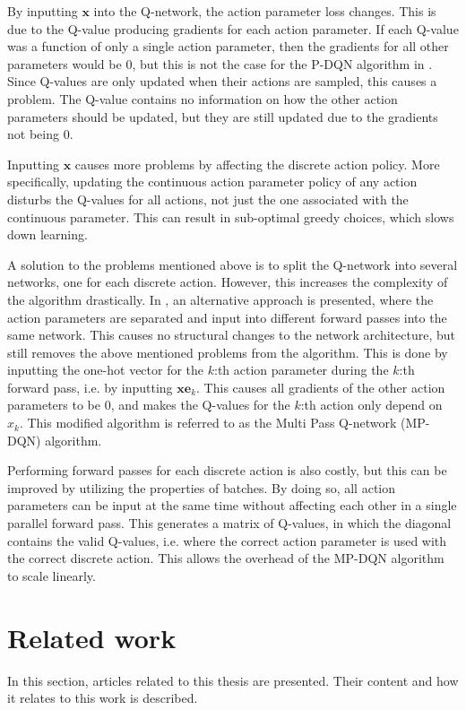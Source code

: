 \documentclass{kththesis}
\begin{document}
By inputting $\boldsymbol{x}$ into the Q-network, the action parameter loss changes. This is due to the Q-value producing gradients for each action parameter. If each Q-value was a function of only a single action parameter, then the gradients for all other parameters would be $0$, but this is not the case for the P-DQN algorithm in \textcite{xiong2018parametrized}. Since Q-values are only updated when their actions are sampled, this causes a problem. The Q-value contains no information on how the other action parameters should be updated, but they are still updated due to the gradients not being $0$. 

Inputting $\boldsymbol{x}$ causes more problems by affecting the discrete action policy. More specifically, updating the continuous action parameter policy of any action disturbs the Q-values for all actions, not just the one associated with the continuous parameter. This can result in sub-optimal greedy choices, which slows down learning. \parencite{bester2019mpdqn}

A solution to the problems mentioned above is to split the Q-network into several networks, one for each discrete action. However, this increases the complexity of the algorithm drastically. In \textcite{bester2019mpdqn}, an alternative approach is presented, where the action parameters are separated and input into different forward passes into the same network. This causes no structural changes to the network architecture, but still removes the above mentioned problems from the algorithm. This is done by inputting the one-hot vector for the $k$:th action parameter during the $k$:th forward pass, i.e. by inputting $\boldsymbol{x}\boldsymbol{e}_k$. This causes all gradients of the other action parameters to be $0$, and makes the Q-values for the $k$:th action only depend on $x_k$. This modified algorithm is referred to as the Multi Pass Q-network (MP-DQN) algorithm. \parencite{bester2019mpdqn}

Performing forward passes for each discrete action is also costly, but this can be improved by utilizing the properties of batches. By doing so, all action parameters can be input at the same time without affecting each other in a single parallel forward pass. This generates a matrix of Q-values, in which the diagonal contains the valid Q-values, i.e. where the correct action parameter is used with the correct discrete action. This allows the overhead of the MP-DQN algorithm to scale linearly. \parencite{bester2019mpdqn}

\section{Related work}
In this section, articles related to this thesis are presented. Their content and how it relates to this work is described.
\end{document}
